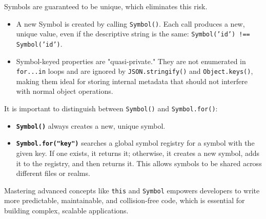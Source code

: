 \documentclass{scrbook}
\begin{document}
Symbols are guaranteed to be unique, which eliminates this risk.

\begin{itemize}
    \item
    A new Symbol is created by calling \texttt{Symbol()}. Each call produces a new, unique value, even if the descriptive string is the same: \texttt{Symbol('id') !== Symbol('id')}.
    
    \item
    Symbol-keyed properties are "quasi-private." They are not enumerated in \texttt{for...in} loops and are ignored by \texttt{JSON.stringify()} and \texttt{Object.keys()}, making them ideal for storing internal metadata that should not interfere with normal object operations.
\end{itemize}

It is important to distinguish between \texttt{Symbol()} and \texttt{Symbol.for()}:

\begin{itemize}
    \item
    \texttt{\textbf{Symbol()}} always creates a new, unique symbol.
    
    \item
    \texttt{\textbf{Symbol.for("key")}} searches a global symbol registry for a symbol with the given key. If one exists, it returns it; otherwise, it creates a new symbol, adds it to the registry, and then returns it. This allows symbols to be shared across different files or realms.
\end{itemize}

Mastering advanced concepts like \texttt{this} and \texttt{Symbol} empowers developers to write more predictable, maintainable, and collision-free code, which is essential for building complex, scalable applications.
\end{document}
